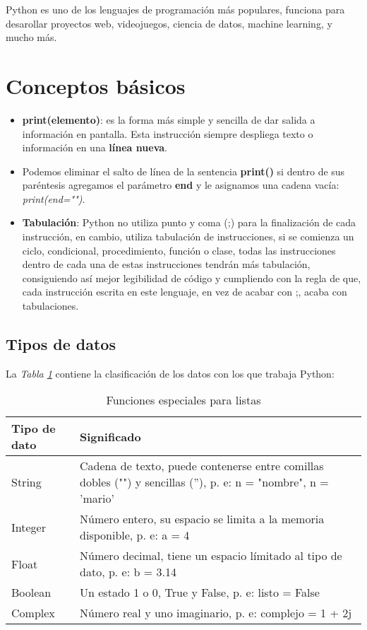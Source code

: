 Python es uno de los lenguajes de programación más populares, funciona para desarollar proyectos web, videojuegos, ciencia de datos, machine learning, y mucho más.

\section{Conceptos básicos}
\begin{itemize}
	\item \textbf{print(elemento)}: es la forma más simple y sencilla de dar salida a información en pantalla. Esta instrucción siempre despliega texto o información en una \textbf{línea nueva}.
	\item Podemos eliminar el salto de línea de la sentencia \textbf{print()} si dentro de sus paréntesis agregamos el parámetro \textbf{end} y le asignamos una cadena vacía: \textit{print(end="")}.
	\item \textbf{Tabulación}: Python no utiliza punto y coma (;) para la finalización de cada instrucción, en cambio, utiliza tabulación de instrucciones, si se comienza un ciclo, condicional, procedimiento, función o clase, todas las instrucciones dentro de cada una de estas instrucciones tendrán más tabulación, consiguiendo así mejor legibilidad de código y cumpliendo con la regla de que, cada instrucción escrita en este lenguaje, en vez de acabar con ;, acaba con tabulaciones.
\end{itemize}


\subsection{Tipos de datos}

La \textit{Tabla \ref{tab: 1}} contiene la clasificación de los datos con los que trabaja Python:
\begin{table}[H]
    \begin{center}
        \caption{Funciones especiales para listas}
        \label{tab: 1}
        \begin{tabular}{m{3cm}|m{10cm}}
            \hline
            \textbf{Tipo de dato} & \textbf{Significado} \\
            \hline
            String		& Cadena de texto, puede contenerse entre comillas dobles ("") y sencillas (''), p. e: n = "nombre", n = 'mario' \\
            Integer		& Número entero, su espacio se limita a la memoria disponible, p. e: a = 4 \\
            Float		& Número decimal, tiene un espacio límitado al tipo de dato, p. e: b = 3.14 \\
            Boolean		& Un estado 1 o 0, True y False, p. e: listo = False \\
            Complex		& Número real y uno imaginario, p. e: complejo = 1 + 2j \\
            \hline
        \end{tabular}
    \end{center}    
\end{table}


